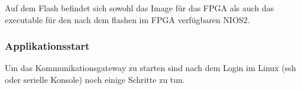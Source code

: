 Auf dem Flash befindet sich sowohl das Image für das \ac{FPGA} als auch das executable für den nach dem flashen im \ac{FPGA} verfügbaren NIOS2. 
\subsubsection{Applikationsstart}
Um das Kommunikationsgateway zu starten sind nach dem Login im Linux (ssh oder serielle Konsole) noch einige Schritte zu tun.
